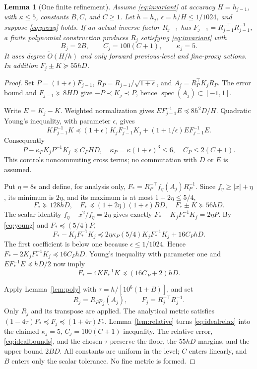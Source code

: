\documentclass[11pt]{article}
\newtheorem{lemma}[theorem]{Lemma}
\newcommand{\tO}{\widetilde O}
\begin{document}
\begin{lemma}[One finite refinement]\label{lem:refine}
Assume \eqref{eq:invariant} at accuracy \(H=h_{j-1}\), with
\(\kappa\leq5\), constants \(B,C\), and \(C\geq1\).
Let \(h=h_j\), \(\epsilon=h/H\leq1/1024\), and suppose
\eqref{eq:proxy} holds. If an actual inverse factor \(R_{j-1}\) has
\(F_{j-1}=R_{j-1}^{-\top}R_{j-1}^{-1}\), a finite polynomial
construction produces \(R_j\) satisfying \eqref{eq:invariant} with
\[
 B_j=2B,\qquad C_j=100(C+1),\qquad\kappa_j=5.
\]
It uses degree \(\tO(H/h)\) and only forward previous-level and
fine-proxy actions. In addition \(F_j\pm K\succeq55hD\).
\end{lemma}
\begin{proof}
Set \(P=(1+\epsilon)F_{j-1}\),
\(R_P=R_{j-1}/\sqrt{1+\epsilon}\), and
\(A_j=R_P^\top K_jR_P\). The error bound and
\(F_{j-1}\succeq8HD\) give \(-P\prec K_j\prec P\), hence
\(\operatorname{spec}(A_j)\subset[-1,1]\).

Write \(E=K_j-K\). Weighted normalization gives
\(EF_{j-1}^{-1}E\preceq8h^2D/H\). Quadratic Young's inequality,
with parameter \(\epsilon\), gives
\[
 KF_{j-1}^{-1}K\preceq(1+\epsilon)K_jF_{j-1}^{-1}K_j
 +(1+1/\epsilon)EF_{j-1}^{-1}E.
\]
Consequently
\begin{equation}\label{eq:young}
 P-\kappa_PK_jP^{-1}K_j\preceq C_PH D,\quad
 \kappa_P=\kappa(1+\epsilon)^3\leq6,\quad C_P\leq2(C+1).
\end{equation}
This controls noncommuting cross terms; no commutation with \(D\) or
\(E\) is assumed.

Put \(\eta=8\epsilon\) and define, for analysis only,
\(F_*=R_P^{-\top}f_\eta(A_j)R_P^{-1}\).
Since \(f_\eta\geq|x|+\eta\), its minimum is \(2\eta\), and its
maximum is at most \(1+2\eta\leq5/4\),
\begin{equation}\label{eq:idealbounds}
 F_*\succeq128hD,\quad F_*\preceq(1+2\eta)(1+\epsilon)BD,
 \quad F_*\pm K\succeq56hD.
\end{equation}
The scalar identity \(f_\eta-x^2/f_\eta=2\eta\) gives exactly
\(F_*-K_jF_*^{-1}K_j=2\eta P\).
By \eqref{eq:young} and \(F_*\preceq(5/4)P\),
\[
 F_*-K_jF_*^{-1}K_j
 \preceq2\eta\kappa_P(5/4)K_jF_*^{-1}K_j+16C_PhD.
\]
The first coefficient is below one because
\(\epsilon\leq1/1024\). Hence
\(F_*-2K_jF_*^{-1}K_j\preceq16C_PhD\).
Young's inequality with parameter one and
\(EF_*^{-1}E\preceq hD/2\) now imply
\begin{equation}\label{eq:idealrelax}
 F_*-4KF_*^{-1}K\preceq(16C_P+2)hD.
\end{equation}

Apply Lemma~\ref{lem:poly} with
\(\tau=h/[10^6(1+B)]\), and set
\[
 R_j=R_Pp_j(A_j),\qquad F_j=R_j^{-\top}R_j^{-1}.
\]
Only \(R_j\) and its transpose are applied. The analytical metric
satisfies \((1-4\tau)F_*\preceq F_j\preceq(1+4\tau)F_*\).
Lemma~\ref{lem:relative} turns \eqref{eq:idealrelax} into the claimed
\(\kappa_j=5\), \(C_j=100(C+1)\) inequality. The relative error,
\eqref{eq:idealbounds}, and the chosen \(\tau\) preserve the floor,
the \(55hD\) margins, and the upper bound \(2BD\).
All constants are uniform in the level; \(C\) enters linearly, and
\(B\) enters only the scalar tolerance. No fine metric is formed.
\end{proof}
\end{document}
